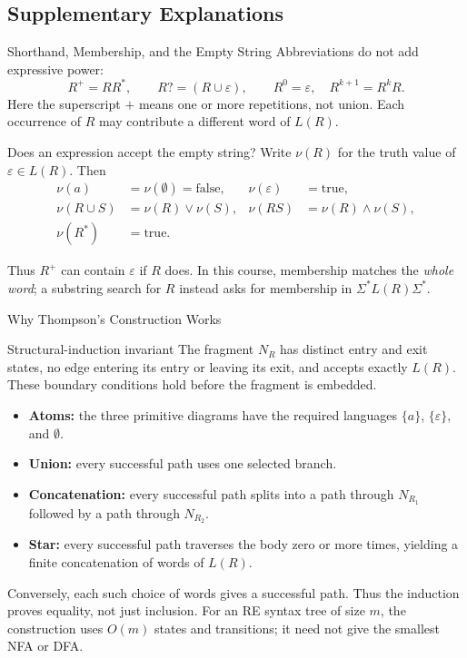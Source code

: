\documentclass[10pt]{beamer}
\begin{document}
\subsection{Supplementary Explanations}

\begin{frame}{Shorthand, Membership, and the Empty String}
  \small
  Abbreviations do not add expressive power:
  \[
    R^+=RR^*,\qquad R?=(R\cup\varepsilon),\qquad
    R^0=\varepsilon,\quad R^{k+1}=R^kR.
  \]
  Here the superscript $+$ means one or more repetitions, not union.
  Each occurrence of $R$ may contribute a different word of $L(R)$.
  \pause
  \begin{block}{Does an expression accept the empty string?}
    Write $\nu(R)$ for the truth value of $\varepsilon\in L(R)$. Then
    \[
      \begin{aligned}
        \nu(a)&=\nu(\emptyset)=\mathrm{false},&
        \nu(\varepsilon)&=\mathrm{true},\\
        \nu(R\cup S)&=\nu(R)\lor\nu(S),&
        \nu(RS)&=\nu(R)\land\nu(S),\\
        \nu(R^*)&=\mathrm{true}.&&
      \end{aligned}
    \]
  \end{block}
  \pause
  Thus $R^+$ can contain $\varepsilon$ if $R$ does. In this course,
  membership matches the \emph{whole word}; a substring search for $R$
  instead asks for membership in $\Sigma^*L(R)\Sigma^*$.
\end{frame}

\begin{frame}{Why Thompson's Construction Works}
  \small
  \begin{block}{Structural-induction invariant}
    The fragment $N_R$ has distinct entry and exit states, no edge entering
    its entry or leaving its exit, and accepts exactly $L(R)$.
    These boundary conditions hold before the fragment is embedded.
  \end{block}
  \pause
  \begin{itemize}
    \item \textbf{Atoms:} the three primitive diagrams have the required
      languages $\{a\}$, $\{\varepsilon\}$, and $\emptyset$.
    \item \textbf{Union:} every successful path uses one selected branch.
    \item \textbf{Concatenation:} every successful path splits into a path
      through $N_{R_1}$ followed by a path through $N_{R_2}$.
    \item \textbf{Star:} every successful path traverses the body zero or
      more times, yielding a finite concatenation of words of $L(R)$.
  \end{itemize}
  \pause
  Conversely, each such choice of words gives a successful path. Thus the
  induction proves equality, not just inclusion. For an RE syntax tree of
  size $m$, the construction uses $O(m)$ states and transitions; it need not
  give the smallest NFA or DFA.
\end{frame}
\end{document}
